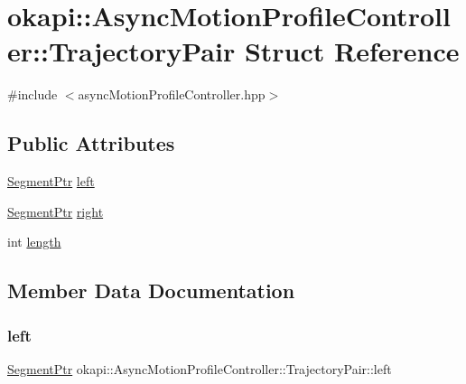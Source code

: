 \hypertarget{structokapi_1_1AsyncMotionProfileController_1_1TrajectoryPair}{}\section{okapi\+::Async\+Motion\+Profile\+Controller\+::Trajectory\+Pair Struct Reference}
\label{structokapi_1_1AsyncMotionProfileController_1_1TrajectoryPair}


{\ttfamily \#include $<$async\+Motion\+Profile\+Controller.\+hpp$>$}

\subsection*{Public Attributes}
\begin{DoxyCompactItemize}
\item 
\mbox{\hyperlink{classokapi_1_1AsyncMotionProfileController_a3ed298e703263af478d65e862afca6f3}{Segment\+Ptr}} \mbox{\hyperlink{structokapi_1_1AsyncMotionProfileController_1_1TrajectoryPair_a4021e1f2c3da40dd50bea69610d49084}{left}}
\item 
\mbox{\hyperlink{classokapi_1_1AsyncMotionProfileController_a3ed298e703263af478d65e862afca6f3}{Segment\+Ptr}} \mbox{\hyperlink{structokapi_1_1AsyncMotionProfileController_1_1TrajectoryPair_ab380266ccc644fe5ef0775617540ce01}{right}}
\item 
int \mbox{\hyperlink{structokapi_1_1AsyncMotionProfileController_1_1TrajectoryPair_a438b73c80a94e07dd9abca0df6d4aa7f}{length}}
\end{DoxyCompactItemize}


\subsection{Member Data Documentation}
\mbox{\label{structokapi_1_1AsyncMotionProfileController_1_1TrajectoryPair_a4021e1f2c3da40dd50bea69610d49084}} 
\subsubsection{\texorpdfstring{left}{left}}
{\footnotesize\ttfamily \mbox{\hyperlink{classokapi_1_1AsyncMotionProfileController_a3ed298e703263af478d65e862afca6f3}{Segment\+Ptr}} okapi\+::\+Async\+Motion\+Profile\+Controller\+::\+Trajectory\+Pair\+::left}

